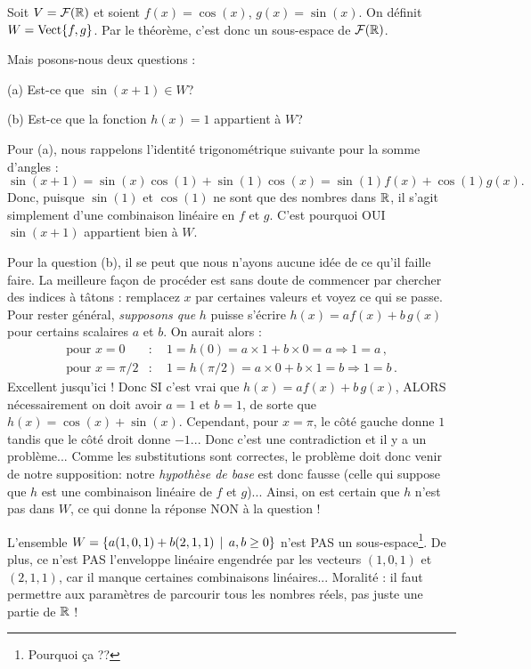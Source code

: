 \begin{myprob} Soit $V = \mathcal{F}(\mathbb{R})$ et soient $f(x) = \cos(x)$, $g(x) = \sin(x)$.
On définit $W = \textrm{Vect}\{f,g\}$. Par le théorème, c'est donc un sous-espace de $\mathcal{F}(\mathbb{R})$.

Mais posons-nous deux questions :

(a) Est-ce que $\sin(x+1) \in W$?

(b) Est-ce que  la fonction $h(x) = 1$ appartient à $W$?

\begin{mysol} Pour (a), nous rappelons l'identité trigonométrique suivante pour la somme d'angles :
$$
\sin(x+1) = \sin(x) \cos(1) + \sin(1) \cos(x) = \sin(1) f(x) + \cos(1) g(x).
$$
Donc, puisque $\sin(1)$ et $\cos(1)$ ne sont que des nombres dans $\mathbb{R}$, il s'agit simplement d'une combinaison linéaire en $f$ et $g$.
 C'est pourquoi OUI  $\sin(x+1)$ appartient bien à $W$.

Pour la question (b), il se peut que nous n'ayons aucune idée de ce qu'il faille faire.  La meilleure façon de procéder est sans doute de commencer par chercher
des indices à tâtons : remplacez $x$ par certaines valeurs et voyez ce qui se passe.  Pour rester général,
{\it supposons que} $h$ puisse s'écrire $h(x) = a f(x) + b\, g(x)$ pour certains scalaires $a$ et $b$.  On aurait alors :
\begin{align*}
\text{pour }x = 0&:\quad  1 = h(0) = a\times1 + b\times0 = a \Longrightarrow 1 = a\,,\\
\text{pour }x=\pi/2 &:\quad 1 = h(\pi/2) = a\times0 + b\times1= b \Longrightarrow 1=b\,.
\end{align*}
Excellent jusqu'ici !  Donc SI c'est vrai que $h(x) = a f(x) + b\, g(x)$, ALORS
nécessairement on doit avoir $a=1$ et $b=1$, de sorte que
$h(x) = \cos(x) + \sin(x)$.
Cependant, pour $x=\pi$, le côté gauche donne $1$ tandis que le côté droit donne $-1$...  Donc c'est une contradiction et il y a un problème... Comme les substitutions sont correctes, le problème doit donc venir de notre supposition: notre {\it hypothèse de base}  est donc fausse (celle qui suppose que $h$ est une combinaison linéaire de $f$ et $g$)...  Ainsi, on est certain que $h$ n'est pas dans $W$, ce qui donne la réponse NON à la question !
\end{mysol}\end{myprob}

\begin{myexample} L'ensemble $W = \{ a(1,0,1) + b(2,1,1) \, \mid \, a,b \geq 0\}$ n'est PAS
un sous-espace\footnote{Pourquoi ça ?\!?}.  De plus, ce n'est PAS l'enveloppe linéaire engendrée par les vecteurs $(1,0,1)$ et
$(2,1,1)$, car il manque certaines combinaisons linéaires... 
Moralité : il faut permettre aux paramètres de parcourir tous les nombres réels, pas juste une partie de $\mathbb{R}$ !
\end{myexample}


